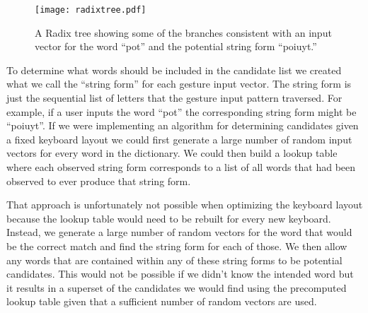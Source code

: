 \documentclass[final,1p,times,authoryear]{elsarticle}
\begin{document}
\begin{figure}[t]
\begin{centering}
\texttt{[image: radixtree.pdf]}
\par\end{centering}
\medskip{}
\protect\caption{A Radix tree showing some of the branches consistent with an input
vector for the word \textquotedblleft pot\textquotedblright{} and
the potential string form \textquotedblleft poiuyt.\textquotedblright \label{fig:A-Radix-tree}}
\end{figure}

To determine what words should be included in the candidate list we
created what we call the ``string form'' for each gesture input vector.
The string form is just the sequential list of letters that the gesture input
pattern traversed. For example, if a user inputs the word ``pot''
the corresponding string form might be ``poiuyt''. If we were implementing
an algorithm for determining candidates given a fixed keyboard layout
we could first generate a large number of random input vectors for
every word in the dictionary. We could then build a lookup table where
each observed string form corresponds to a list of all words that
had been observed to ever produce that string form.

That approach is unfortunately not possible when optimizing the keyboard
layout because the lookup table would need to be rebuilt for every
new keyboard. Instead, we generate a large number of random vectors
for the word that would be the correct match and find the string form
for each of those. We then allow any words that are contained within
any of these string forms to be potential candidates. This would not
be possible if we didn't know the intended word but it results in
a superset of the candidates we would find using the precomputed lookup
table given that a sufficient number of random vectors are used. 
\end{document}
